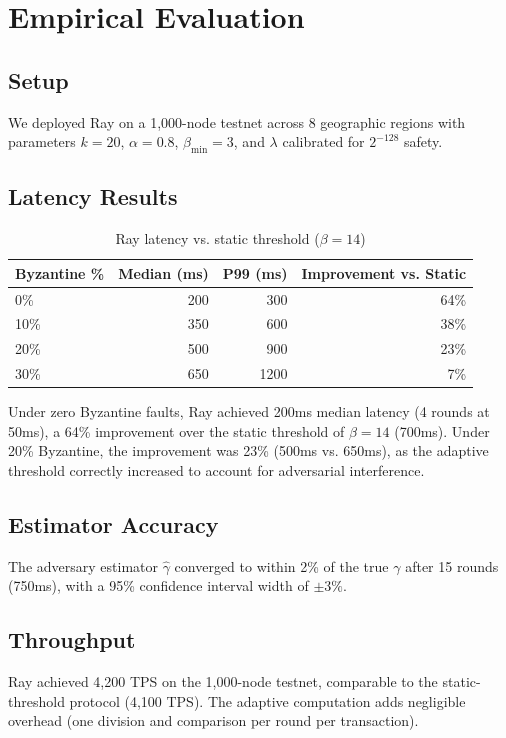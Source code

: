 \section{Empirical Evaluation}

\label{sec:evaluation}

\subsection{Setup}

We deployed Ray on a 1,000-node testnet across 8 geographic regions with parameters
$k = 20$, $\alpha = 0.8$, $\beta_{\min} = 3$, and $\lambda$ calibrated for $2^{-128}$ safety.

\subsection{Latency Results}

\begin{table}[h]
\centering
\begin{tabular}{@{}lrrr@{}}
\toprule
\textbf{Byzantine \%} & \textbf{Median (ms)} & \textbf{P99 (ms)} & \textbf{Improvement vs. Static} \\
\midrule
0\% & 200 & 300 & 64\% \\
10\% & 350 & 600 & 38\% \\
20\% & 500 & 900 & 23\% \\
30\% & 650 & 1200 & 7\% \\
\bottomrule
\end{tabular}
\caption{Ray latency vs. static threshold ($\beta = 14$)}
\label{tab:latency}
\end{table}

Under zero Byzantine faults, Ray achieved 200ms median latency (4 rounds at 50ms),
a 64\% improvement over the static threshold of $\beta = 14$ (700ms). Under 20\%
Byzantine, the improvement was 23\% (500ms vs. 650ms), as the adaptive threshold
correctly increased to account for adversarial interference.

\subsection{Estimator Accuracy}

The adversary estimator $\hat{\gamma}$ converged to within 2\% of the true $\gamma$
after 15 rounds (750ms), with a 95\% confidence interval width of $\pm 3\%$.

\subsection{Throughput}

Ray achieved 4,200 TPS on the 1,000-node testnet, comparable to the static-threshold
protocol (4,100 TPS). The adaptive computation adds negligible overhead (one division
and comparison per round per transaction).


